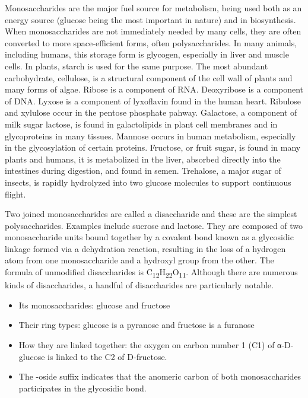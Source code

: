 Monosaccharides are the major fuel source for metabolism, being used both as an energy source (glucose being the most important in nature) and in biosynthesis. When monosaccharides are not immediately needed by many cells, they are often converted to more space-efficient forms, often polysaccharides. In many animals, including humans, this storage form is glycogen, especially in liver and muscle cells. In plants, starch is used for the same purpose. The most abundant carbohydrate, cellulose, is a structural component of the cell wall of plants and many forms of algae. Ribose is a component of RNA. Deoxyribose is a component of DNA. Lyxose is a component of lyxoflavin found in the human heart. Ribulose and xylulose occur in the pentose phosphate pahway. Galactose, a component of milk sugar lactose, is found in galactolipids in plant cell membranes and in glycoproteins in many tissues. Mannose occurs in human metabolism, especially in the glycosylation of certain proteins. Fructose, or fruit sugar, is found in many plants and humans, it is metabolized in the liver, absorbed directly into the intestines during digestion, and found in semen. Trehalose, a major sugar of insects, is rapidly hydrolyzed into two glucose molecules to support continuous flight.

Two joined monosaccharides are called a disaccharide and these are the simplest polysaccharides. Examples include sucrose and lactose. They are composed of two monosaccharide units bound together by a covalent bond known as a glycosidic linkage formed via a dehydration reaction, resulting in the loss of a hydrogen atom from one monosaccharide and a hydroxyl group from the other. The formula of unmodified disaccharides is C\textsubscript{12}H\textsubscript{22}O\textsubscript{11}. Although there are numerous kinds of disaccharides, a handful of disaccharides are particularly notable.

\begin{itemize}
\tightlist
\item
  Its monosaccharides: glucose and fructose
\item
  Their ring types: glucose is a pyranose and fructose is a furanose
\item
  How they are linked together: the oxygen on carbon number 1 (C1) of α-D-glucose is linked to the C2 of D-fructose.
\item
  The -oside suffix indicates that the anomeric carbon of both monosaccharides participates in the glycosidic bond.
\end{itemize}

